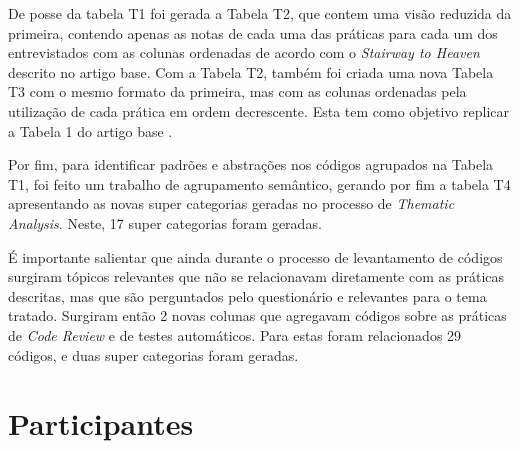 

De posse da tabela T1 foi gerada a Tabela T2, que contem uma visão reduzida da primeira, contendo apenas as notas de cada uma das práticas para cada um dos entrevistados com as colunas ordenadas de acordo com o \emph{Stairway to Heaven} descrito no artigo base. Com a Tabela T2, também foi criada uma nova Tabela T3 com o mesmo formato da primeira, mas com as colunas ordenadas pela utilização de cada prática em ordem decrescente. Esta tem como objetivo replicar a Tabela 1 do artigo base \cite{empiricalStudy2016}.


Por fim, para identificar padrões e abstrações nos códigos agrupados na Tabela T1, foi feito um trabalho de agrupamento semântico, gerando por fim a tabela T4 apresentando as novas super categorias geradas no processo de \emph{Thematic Analysis}. Neste, 17 super categorias foram geradas.

É importante salientar que ainda durante o processo de levantamento de códigos surgiram tópicos relevantes que não se relacionavam diretamente com as práticas descritas, mas que são perguntados pelo questionário e relevantes para o tema tratado. Surgiram então 2 novas colunas que agregavam códigos sobre as práticas de \emph{Code Review} e de testes automáticos. Para estas foram relacionados 29 códigos, e duas super categorias foram geradas.



\section{Participantes}

